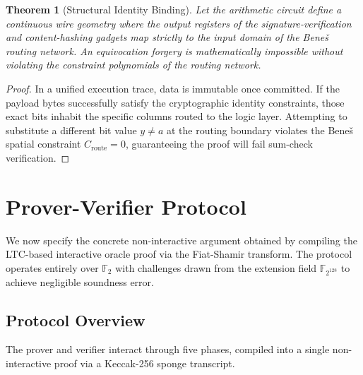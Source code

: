 \documentclass[11pt,a4paper]{article}
\newtheorem{theorem}{Theorem}[section]
\begin{document}
\begin{theorem}[Structural Identity Binding]\label{thm:identity}
Let the arithmetic circuit define a continuous wire geometry where
the output registers of the signature-verification and
content-hashing gadgets map strictly to the input domain of the
Bene\v{s} routing network.  An equivocation forgery is
mathematically impossible without violating the constraint
polynomials of the routing network.
\end{theorem}

\begin{proof}
In a unified execution trace, data is immutable once committed.  If
the payload bytes successfully satisfy the cryptographic identity
constraints, those exact bits inhabit the specific columns routed to
the logic layer.  Attempting to substitute a different bit value
$y \neq a$ at the routing boundary violates the Bene\v{s} spatial
constraint $C_{\mathrm{route}} = 0$, guaranteeing the proof will
fail sum-check verification.
\end{proof}

\section{Prover-Verifier Protocol}\label{sec:protocol}

We now specify the concrete non-interactive argument obtained by
compiling the LTC-based interactive oracle proof via the
Fiat-Shamir transform.  The protocol operates entirely over
$\mathbb{F}_2$ with challenges drawn from the extension field
$\mathbb{F}_{2^{128}}$ to achieve negligible soundness error.

\subsection{Protocol Overview}

The prover and verifier interact through five phases, compiled
into a single non-interactive proof via a Keccak-256 sponge
transcript.
\end{document}
